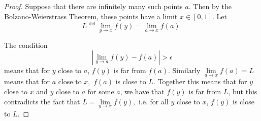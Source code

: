 \documentclass[12pt]{article}
\theoremstyle{plain}
\theoremstyle{definition}
\theoremstyle{remark}
\newcommand{\defeq}{\overset{\mathrm{def}}{=}}
\begin{document}
\begin{proof}
Suppose that there are infinitely many such points $a.$ Then by the Bolzano-Weierstrass Theorem, these points have a limit $x \in [0, 1].$ Let $$L \defeq \lim\limits_{y \to x} f(y) = \lim\limits_{a\to x} f(a).$$

The condition $$|\lim\limits_{y\to a} f(y) - f(a)| > \epsilon$$ means that for $y$ close to $a$, $f(y)$ is far from $f(a).$ Similarly $\lim\limits_{a \to x} f(a) = L$ means that for $a$ close to $x,$ $f(a)$ is close to $L.$ Together this means that for $y$ close to $x$ and $y$ close to $a$ for some $a$, we have that $f(y)$ is far from $L$, but this contradicts the fact that $L = \lim\limits_{y \to x} f(y),$ i.e. for all $y$ close to $x$, $f(y)$ is close to $L.$
\end{proof}
\end{document}
